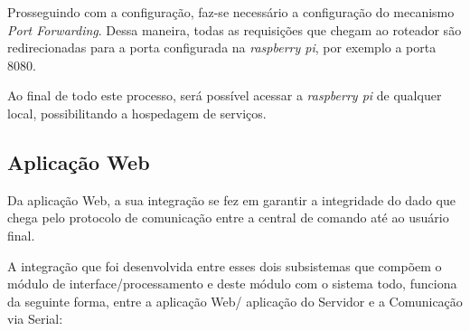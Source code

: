Prosseguindo com a configuração, faz-se necessário a configuração do mecanismo \textit{Port Forwarding}. Dessa maneira, todas as requisições que chegam ao roteador são redirecionadas para a porta configurada na \textit{raspberry pi}, por exemplo a porta 8080.

Ao final de todo este processo, será possível acessar a \textit{raspberry pi} de qualquer local, possibilitando a hospedagem de serviços.

\subsection{Aplicação Web}

Da aplicação Web, a sua integração se fez em garantir a integridade do dado que chega pelo protocolo de comunicação entre a central de comando até ao usuário final.

A integração que foi desenvolvida entre esses dois subsistemas que compõem o módulo de interface/processamento e deste módulo com o sistema todo, funciona da seguinte forma, entre a aplicação Web/ aplicação do Servidor e a Comunicação via Serial:

